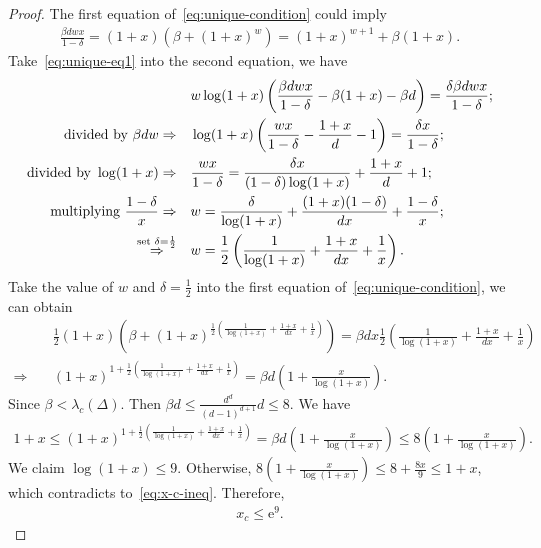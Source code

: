 \documentclass[11pt,a4paper]{article}
\newcommand{\e}{\mathrm{e}}
\theoremstyle{definition}
\begin{document}
\begin{proof}
The first equation of~\eqref{eq:unique-condition} could imply
\begin{align}\label{eq:unique-eq1}
    \frac{\beta d w x}{1-\delta}=(1+x)(\beta+(1+x)^w)=(1+x)^{w+1}+\beta(1+x).
\end{align}
Take~\eqref{eq:unique-eq1} into the second equation, we have
\begin{align}\label{eq:unique-w}
    &w\log (1+x)\left(\frac{\beta d w x}{1-\delta}-\beta(1+x)-\beta d\right) = \frac{\delta\beta d w x}{1-\delta};\notag\\
    \textnormal{divided by }\beta dw\Rightarrow\quad &\log (1+x)\left(\frac{w x}{1-\delta}-\frac{1+x}{d}-1\right) = \frac{\delta x}{1-\delta};\notag\\
    \textnormal{divided by }\log (1+x)\Rightarrow\quad &\frac{wx}{1-\delta} = \frac{\delta x}{(1-\delta)\log (1+x)}+\frac{1+x}{d}+1;\notag\\
    \textnormal{multiplying }\frac{1-\delta}{x}\Rightarrow\quad &w=\frac{\delta }{\log (1+x)}+\frac{(1+x)(1-\delta)}{d x} + \frac{1-\delta}{x};\notag\\
        \overset{\text{set }\delta=\frac{1}{2}}{\Rightarrow} \quad&w=\frac{1}{2}\left(\frac{1}{\log (1+x)}+\frac{1+x}{d x} + \frac{1}{x}\right). 
\end{align}    
Take the value of $w$ and $\delta=\frac{1}{2}$ into the first equation of~\eqref{eq:unique-condition}, we can obtain
\begin{align*}
    &\frac{1}{2}(1+x)\left(\beta+(1+x)^{\frac{1}{2}\left(\frac{1}{\log (1+x)}+\frac{1+x}{d x} + \frac{1}{x}\right)}\right)=\beta dx\frac{1}{2}\left(\frac{1}{\log (1+x)}+\frac{1+x}{d x} + \frac{1}{x}\right)\\
    \Rightarrow\quad&(1+x)^{1+\frac{1}{2}\left(\frac{1}{\log (1+x)}+\frac{1+x}{d x} + \frac{1}{x}\right)}=\beta d\left(1+\frac{x}{\log (1+x)}\right).
\end{align*}
Since $\beta < \lambda_c(\Delta)$. Then $\beta d\leq \frac{d^d}{(d-1)^{d+1}}d\leq 8$. We have
\begin{align}\label{eq:x-c-ineq}
    1+x\leq (1+x)^{1+\frac{1}{2}\left(\frac{1}{\log (1+x)}+\frac{1+x}{d x} + \frac{1}{x}\right)}=\beta d\left(1+\frac{x}{\log (1+x)}\right) \leq 8\left(1+\frac{x}{\log(1+x)}\right).
\end{align}
We claim $\log(1+x)\leq 9$. Otherwise, $8(1+\frac{x}{\log(1+x)})\leq8 + \frac{8x}{9}\leq 1+x$, which contradicts to~\eqref{eq:x-c-ineq}. Therefore,
\begin{align}\label{eq:x-c-bound}
    x_c\leq \e^{9}.
\end{align}

\end{proof}
\end{document}
